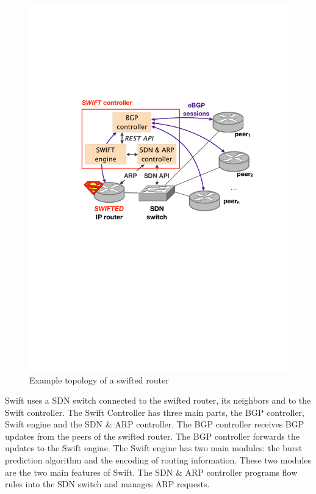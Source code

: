 \begin{figure}[h]
\center
\includegraphics[scale = 0.5]{Figures/bckgrnd_swift_architecture.pdf}
\caption{Example topology of a swifted router}
\end{figure}

Swift uses a SDN switch connected to the swifted router, its neighbors and to the Swift controller. The Swift Controller has three main parts, the  BGP controller, Swift engine and the SDN \& ARP controller. The BGP controller receives BGP updates from the peers of the swifted router. The BGP controller forwards the updates to the Swift engine. The Swift engine has two main modules: the burst prediction algorithm and the encoding of routing information. These two modules are the two main features of Swift. The SDN \& ARP controller programs flow rules into the SDN switch and manages ARP requests. 



